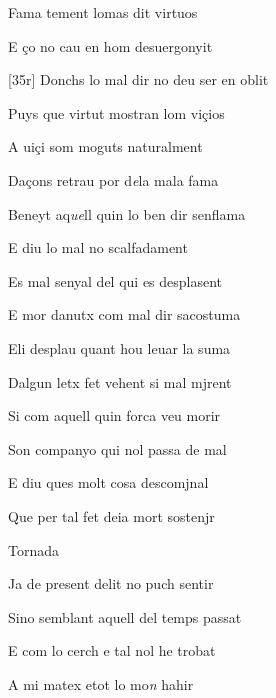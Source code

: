 \documentclass[12pt]{article}
\begin{document}
\begin{estrofa}

 Fama tement lomas dit virtuos

 E \c{c}o no cau en hom desuergonyit

 [35r] Donchs lo mal dir no deu ser en oblit

 Puys que virtut mostran lom vi\c{c}ios

 A ui\c{c}i som moguts naturalment

 Da\c{c}ons retrau por d\textit{e}la mala fama

 Beneyt aq\textit{ue}ll quin lo ben dir senflama

 E diu lo mal no scalfadament

\end{estrofa}



\begin{estrofa}

 Es mal senyal del qui es desplasent

 E mor danutx com mal dir sacostuma

 Eli desplau quant hou leuar la suma

 Dalgun letx fet vehent si mal mjrent

 Si com aquell quin forca veu morir

 Son companyo qui nol passa de mal

 E diu ques molt cosa descomjnal

 Que per tal fet deia mort sostenjr

\end{estrofa}


\begin{estrofaExtra}%




\begin{tornada}

Tornada

\end{tornada}


\end{estrofaExtra}


\begin{estrofa}

 Ja de present delit no puch sentir

 Sino semblant aquell del temps passat

 E com lo cerch e tal nol he trobat

 A mi matex etot lo mo\textit{n} hahir

\end{estrofa}
\end{document}
